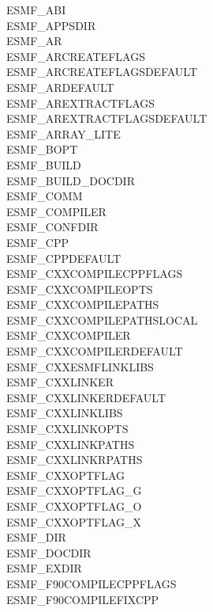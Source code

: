\begin{description}

\item[ESMF\_ABI]
\item[ESMF\_APPSDIR]
\item[ESMF\_AR]
\item[ESMF\_ARCREATEFLAGS]
\item[ESMF\_ARCREATEFLAGSDEFAULT]
\item[ESMF\_ARDEFAULT]
\item[ESMF\_AREXTRACTFLAGS]
\item[ESMF\_AREXTRACTFLAGSDEFAULT]
\item[ESMF\_ARRAY\_LITE]
\item[ESMF\_BOPT]
\item[ESMF\_BUILD]
\item[ESMF\_BUILD\_DOCDIR]
\item[ESMF\_COMM]
\item[ESMF\_COMPILER]
\item[ESMF\_CONFDIR]
\item[ESMF\_CPP]
\item[ESMF\_CPPDEFAULT]
\item[ESMF\_CXXCOMPILECPPFLAGS]
\item[ESMF\_CXXCOMPILEOPTS]
\item[ESMF\_CXXCOMPILEPATHS]
\item[ESMF\_CXXCOMPILEPATHSLOCAL]
\item[ESMF\_CXXCOMPILER]
\item[ESMF\_CXXCOMPILERDEFAULT]
\item[ESMF\_CXXESMFLINKLIBS]
\item[ESMF\_CXXLINKER]
\item[ESMF\_CXXLINKERDEFAULT]
\item[ESMF\_CXXLINKLIBS]
\item[ESMF\_CXXLINKOPTS]
\item[ESMF\_CXXLINKPATHS]
\item[ESMF\_CXXLINKRPATHS]
\item[ESMF\_CXXOPTFLAG]
\item[ESMF\_CXXOPTFLAG\_G]
\item[ESMF\_CXXOPTFLAG\_O]
\item[ESMF\_CXXOPTFLAG\_X]
\item[ESMF\_DIR]
\item[ESMF\_DOCDIR]
\item[ESMF\_EXDIR]
\item[ESMF\_F90COMPILECPPFLAGS]
\item[ESMF\_F90COMPILEFIXCPP]

\end{description}
